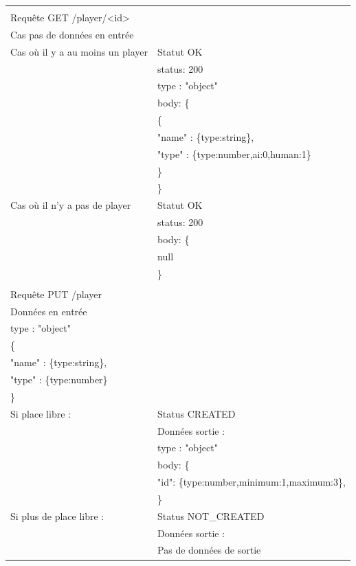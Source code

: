 \documentclass[12pt,a4paper]{article}
\begin{document}
\begin{longtable}{ll}
    & & \\
    
   Requête GET /player/<id> &  \\
   \hline
   \hline
   Cas pas de données en entrée &  \\
   \hline
   Cas où il y a au moins un player & Statut OK\\
    & status: 200\\
    & type : "object"\\
    & body: \{ \\
    &      \hspace{1cm}\{\\
    &          \hspace{2cm}"name" : \{type:string\},\\
    &          \hspace{2cm}"type" : \{type:number,ai:0,human:1\}\\
    &      \hspace{1cm}\}\\
    & \}\\
   \hline
    Cas où il n'y a pas de player & Statut OK\\
    & status: 200\\
    & body: \{ \\
    & \hspace{1cm}null\\
    & \}\\

    & & \\
    
   Requête PUT /player &  \\
   \hline
   \hline
   Données en entrée &  \\
   \hline
    type : "object" & \\
   \{ & \\
    \hspace{1cm} "name" : \{type:string\}, & \\
    \hspace{1cm} "type" : \{type:number\} & \\
   \} & \\
   \hline
   Si place libre : & Status CREATED \\
   & Données sortie :\\ 
   & type : "object"\\
   & body: \{\\
   & \hspace{1cm} "id": \{type:number,minimum:1,maximum:3\},\\
   & \}\\
   \hline
   Si plus de place libre : & Status NOT\_CREATED \\
   & Données sortie :\\ 
   & Pas de données de sortie\\


\end{longtable}
\end{document}
